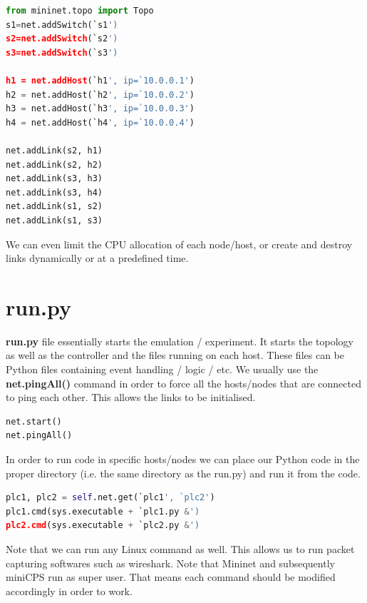 \documentclass[book,a4paper,12pt]{memoir}
\begin{document}
\begin{lstlisting}[backgroundcolor = \color{ultralightgray}, language = Python, xleftmargin = 0.1cm, framexleftmargin = 0.3em, showstringspaces=false]
from mininet.topo import Topo
s1=net.addSwitch(`s1')
s2=net.addSwitch(`s2')
s3=net.addSwitch(`s3')

h1 = net.addHost(`h1', ip=`10.0.0.1')
h2 = net.addHost(`h2', ip=`10.0.0.2')
h3 = net.addHost(`h3', ip=`10.0.0.3')
h4 = net.addHost(`h4', ip=`10.0.0.4')

net.addLink(s2, h1)
net.addLink(s2, h2)
net.addLink(s3, h3)
net.addLink(s3, h4)
net.addLink(s1, s2)
net.addLink(s1, s3)
\end{lstlisting}


\noindent We can even limit the CPU allocation of each node/host, or create and destroy links dynamically or at a predefined time.

\newpage
\section{run.py}
\label{cha:basicuse-sec:run}
\textbf{run.py} file essentially starts the emulation / experiment.  It starts the topology as well as the controller and the files running on each host.  These files can be Python files containing event handling / logic / etc.
We usually use the \textbf{net.pingAll()} command in order to force all the hosts/nodes that are connected to ping each other.  This allows the links to be initialised.  

\begin{lstlisting}[backgroundcolor = \color{ultralightgray}, language = Python, xleftmargin = 0.1cm, framexleftmargin = 0.3em, showstringspaces=false]
net.start()
net.pingAll()
\end{lstlisting}


\noindent In order to run code in specific hosts/nodes we can place our Python code in the proper directory (i.e. the same directory as the run.py) and run it from the code.

\begin{lstlisting}[backgroundcolor = \color{ultralightgray}, language = Python, xleftmargin = 0.1cm, framexleftmargin = 0.3em, showstringspaces=false]
plc1, plc2 = self.net.get(`plc1', `plc2')
plc1.cmd(sys.executable + `plc1.py &')
plc2.cmd(sys.executable + `plc2.py &')
\end{lstlisting}


\noindent Note that we can run any Linux command as well.  This allows us to run packet capturing softwares such as wireshark.  Note that Mininet and subsequently miniCPS run as super user.  That means each command should be modified accordingly in order to work.
\end{document}
